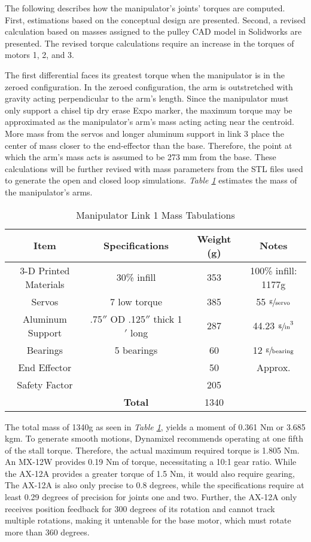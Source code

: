 The following describes how the manipulator’s joints’ torques are computed. First, estimations based on the conceptual design are presented. Second, a revised calculation based on masses assigned to the pulley CAD model in Solidworks are presented. The revised torque calculations require an increase in the torques of motors 1, 2, and 3.


The first differential faces its greatest torque when the manipulator is in the zeroed configuration. In the zeroed configuration, the arm is outstretched with gravity acting perpendicular to the arm’s length. Since the manipulator must only support a chisel tip dry erase Expo marker, the maximum torque may be approximated as the manipulator’s arm’s mass acting acting near the centroid. More mass from the servos and longer aluminum support in link 3 place the center of mass closer to the end-effector than the base. Therefore, the point at which the arm’s mass acts is assumed to be 273 mm from the base. These calculations will be further revised with mass parameters from the STL files used to generate the open and closed loop simulations. \emph{Table \ref{tab:arm1}} estimates the mass of the manipulator's arms.
\begin{table}[htp]
  \center
  \caption{Manipulator Link 1 Mass Tabulations}
  \label{tab:arm1}
\begin{tabular}{cc|cc}
  \textbf{Item} & \textbf{Specifications} & \textbf{Weight (g)} & \textbf{Notes} \\\hline
  3-D Printed Materials & 30\% infill & 353 & 100\% infill: 1177g \\
  Servos & 7 low torque & 385 & 55 $\sfrac{\text{g}}{\text{servo}}$ \\
  Aluminum Support & .75$''$  OD .125$''$  thick 1$'$ long & 287 & 44.23 $\sfrac{\text{g}}{\text{in}}^3$ \\
  Bearings & 5 bearings & 60 & 12 $\sfrac{\text{g}}{\text{bearing}}$ \\
  End Effector & & 50 & Approx. \\
  Safety Factor & & 205 & \\
  & \textbf{Total} & 1340 & \\
\end{tabular}
\end{table}

The total mass of 1340g as seen in \emph{Table \ref{tab:arm1}}, yields a moment of 0.361 Nm or 3.685 kgm. To generate smooth motions, Dynamixel recommends operating at one fifth of the stall torque. Therefore, the actual maximum required torque is 1.805 Nm. An MX-12W provides 0.19 Nm of torque, necessitating a 10:1 gear ratio. While the AX-12A provides a greater torque of 1.5 Nm, it would also require gearing, The AX-12A is also only precise to 0.8 degrees, while the specifications require at least 0.29 degrees of precision for joints one and two. Further, the AX-12A only receives position feedback for 300 degrees of its rotation and cannot track multiple rotations, making it untenable for the base motor, which must rotate more than 360 degrees.

